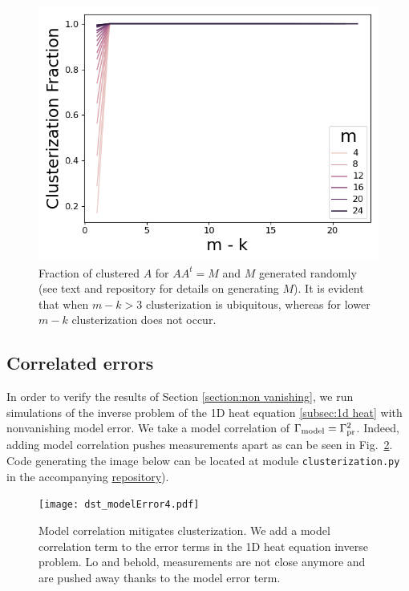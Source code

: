 \begin{figure}
    \centering
    \includegraphics[height=0.5\textwidth]{simulations.png}
    \caption{Fraction of clustered $A$ for $AA^t = M$ and $M$
      generated randomly (see text and repository for details on
      generating $M$). It is evident that when $m-k >3$ clusterization
      is ubiquitous, whereas for lower $m-k$ clusterization does not
      occur.}
  \label{fig:sim AAt}
\end{figure}


\subsection{Correlated errors}\label{subsec:corr errors sims}
In order to verify the results of Section \ref{section:non vanishing},
we run simulations of the inverse problem of the 1D heat equation
\ref{subsec:1d heat} with nonvanishing model error. We take a model
correlation of \(\Gamma_{\textup{model}} = \Gamma_{\textup{pr}}^2 \). Indeed, adding model
correlation pushes measurements apart as can be seen in
Fig.~\ref{fig:corr errors}. Code generating the image below can be
located at module \texttt{clusterization.py} in the accompanying
\href{https://github.com/yairdaon/OED}{repository}).

\begin{figure}
    \centering
    \texttt{[image: dst\_modelError4.pdf]}
    \caption{Model correlation mitigates clusterization. We add a
      model correlation term to the error terms in the 1D heat
      equation inverse problem. Lo and behold, measurements are not
      close anymore and are pushed away thanks to the model error
      term.}
  \label{fig:corr errors}
\end{figure}


